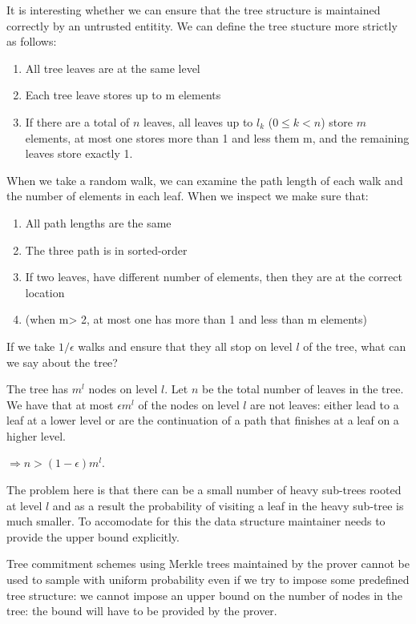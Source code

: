 \documentclass[11pt,twocolumn]{MyTightStyle}
\theoremstyle{plain}
\theoremstyle{definition}
\theoremstyle{remark}
\numberwithin{equation}{section}
\begin{document}
It is interesting whether we can ensure that the tree structure is
maintained correctly by an untrusted entitity. We can define the tree
stucture more strictly as follows:
\begin{enumerate}
  \item All tree leaves are at the same level
  \item Each tree leave stores up to m elements
  \item If there are a total of $n$ leaves, all leaves up to $l_k$ ($0
  \leq k < n$) store $m$ elements, at most one stores more than 1 and
  less them m, and the remaining leaves store exactly 1.
\end{enumerate}

When we take a random walk, we can examine the path length of each
walk and the number of elements in each leaf. When we inspect we make
sure that:

\begin{enumerate}
  \item All path lengths are the same
  \item The three path is in sorted-order
  \item If two leaves, have different number of elements,  then they
  are at the correct location
  \item (when m> 2, at most one has more than 1 and less than m
  elements)
\end{enumerate}

If we take $1/\epsilon$ walks and ensure that they all stop on level
$l$ of the tree, what can we say about the tree?

The tree has $m^l$ nodes on level $l$. Let $n$ be the total number of
leaves in the tree. We have that at most $\epsilon m^l$ of the nodes
on level $l$ are not leaves: either lead to a leaf at a lower level or are the
continuation of a path that finishes at a leaf on a higher level.

$\Rightarrow n > (1-\epsilon)m^l$.

The problem here is that there can be a small number of heavy
sub-trees rooted at level $l$ and as a result the probability of
visiting a leaf in the heavy sub-tree is much smaller. To accomodate
for this the data structure maintainer needs to provide the upper
bound explicitly.

Tree commitment schemes using Merkle trees maintained by the prover
cannot be used to sample with uniform probability even if we try to
impose some predefined tree structure: we cannot impose an upper bound on the
number of nodes in the tree: the bound will have to be provided by the
prover.
\end{document}
